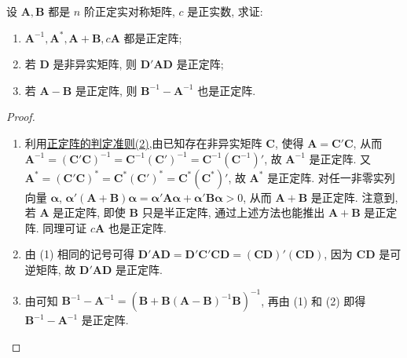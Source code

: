 \documentclass[../../main.tex]{subfiles}
\begin{document}
\begin{proposition}\label{proposition:正定阵的性质123}
设 \(\boldsymbol{A},\boldsymbol{B}\) 都是 \(n\) 阶正定实对称矩阵, \(c\) 是正实数, 求证:
\begin{enumerate}[(1)]
\item \(\boldsymbol{A}^{-1},\boldsymbol{A}^*,\boldsymbol{A}+\boldsymbol{B},c\boldsymbol{A}\) 都是正定阵;
\item 若 \(\boldsymbol{D}\) 是非异实矩阵, 则 \(\boldsymbol{D}'\boldsymbol{A}\boldsymbol{D}\) 是正定阵;
\item 若 \(\boldsymbol{A}-\boldsymbol{B}\) 是正定阵, 则 \(\boldsymbol{B}^{-1}-\boldsymbol{A}^{-1}\) 也是正定阵.
\end{enumerate}
\end{proposition}
\begin{proof}
\begin{enumerate}[(1)]
\item 利用\hyperref[proposition:正定阵的判定准则]{正定阵的判定准则(2)},由已知存在非异实矩阵 \(\boldsymbol{C}\), 使得 \(\boldsymbol{A}=\boldsymbol{C}'\boldsymbol{C}\), 从而 \(\boldsymbol{A}^{-1}=(\boldsymbol{C}'\boldsymbol{C})^{-1}=\boldsymbol{C}^{-1}(\boldsymbol{C}')^{-1}=\boldsymbol{C}^{-1}(\boldsymbol{C}^{-1})'\), 故 \(\boldsymbol{A}^{-1}\) 是正定阵. 又 \(\boldsymbol{A}^*=(\boldsymbol{C}'\boldsymbol{C})^*=\boldsymbol{C}^*(\boldsymbol{C}')^*=\boldsymbol{C}^*(\boldsymbol{C}^*)'\), 故 \(\boldsymbol{A}^*\) 是正定阵. 对任一非零实列向量 \(\boldsymbol{\alpha}\), \(\boldsymbol{\alpha}'(\boldsymbol{A}+\boldsymbol{B})\boldsymbol{\alpha}=\boldsymbol{\alpha}'\boldsymbol{A}\boldsymbol{\alpha}+\boldsymbol{\alpha}'\boldsymbol{B}\boldsymbol{\alpha}>0\), 从而 \(\boldsymbol{A}+\boldsymbol{B}\) 是正定阵. 注意到, 若 \(\boldsymbol{A}\) 是正定阵, 即使 \(\boldsymbol{B}\) 只是半正定阵, 通过上述方法也能推出 \(\boldsymbol{A}+\boldsymbol{B}\) 是正定阵. 同理可证 \(c\boldsymbol{A}\) 也是正定阵.
\item 由 (1) 相同的记号可得 \(\boldsymbol{D}'\boldsymbol{A}\boldsymbol{D}=\boldsymbol{D}'\boldsymbol{C}'\boldsymbol{C}\boldsymbol{D}=(\boldsymbol{C}\boldsymbol{D})'(\boldsymbol{C}\boldsymbol{D})\), 因为 \(\boldsymbol{C}\boldsymbol{D}\) 是可逆矩阵, 故 \(\boldsymbol{D}'\boldsymbol{A}\boldsymbol{D}\) 是正定阵. 
\item 由可知 \(\boldsymbol{B}^{-1}-\boldsymbol{A}^{-1}=(\boldsymbol{B}+\boldsymbol{B}(\boldsymbol{A}-\boldsymbol{B})^{-1}\boldsymbol{B})^{-1}\), 再由 (1) 和 (2) 即得 \(\boldsymbol{B}^{-1}-\boldsymbol{A}^{-1}\) 是正定阵. 
\end{enumerate}
\end{proof}
\end{document}
